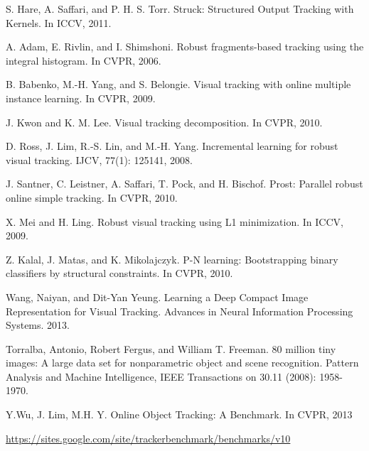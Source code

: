 \documentclass{acm_proc_article-sp}
\begin{document}
\begin{thebibliography}{99}
S. Hare, A. Saffari, and P. H. S. Torr. Struck: Structured Output Tracking with Kernels. In ICCV, 2011.

A. Adam, E. Rivlin, and I. Shimshoni. Robust fragments-based tracking using the integral histogram. In CVPR, 2006.

B. Babenko, M.-H. Yang, and S. Belongie. Visual tracking with online multiple instance learning. In CVPR, 2009.

J. Kwon and K. M. Lee. Visual tracking decomposition. In CVPR, 2010.

D. Ross, J. Lim, R.-S. Lin, and M.-H. Yang. Incremental learning for robust visual tracking. IJCV, 77(1): 125141, 2008.

J. Santner, C. Leistner, A. Saffari, T. Pock, and H. Bischof. Prost: Parallel robust online simple tracking. In CVPR, 2010.

X. Mei and H. Ling. Robust visual tracking using L1 minimization. In ICCV, 2009.

Z. Kalal, J. Matas, and K. Mikolajczyk. P-N learning: Bootstrapping binary classifiers by structural constraints. In CVPR, 2010.

Wang, Naiyan, and Dit-Yan Yeung. Learning a Deep Compact Image Representation for Visual Tracking. Advances in Neural Information Processing Systems. 2013.

Torralba, Antonio, Robert Fergus, and William T. Freeman. 80 million tiny images: A large data set for nonparametric object and scene recognition. Pattern Analysis and Machine Intelligence, IEEE Transactions on 30.11 (2008): 1958-1970.

Y.Wu, J. Lim, M.H. Y. Online Object Tracking: A Benchmark. In CVPR, 2013

\url{https://sites.google.com/site/trackerbenchmark/benchmarks/v10}

\end{thebibliography}
\end{document}
